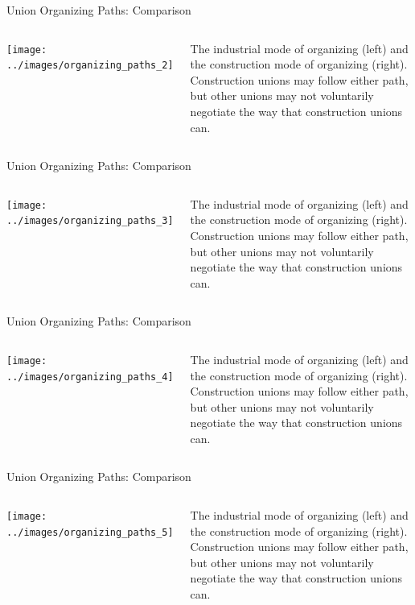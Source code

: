 \documentclass{beamer}
\begin{document}
\begin{frame}{Union Organizing Paths: Comparison}
  \begin{columns}
    \texttt{[image: ../images/organizing\_paths\_2]}

    The industrial mode of organizing (left) and the construction mode of organizing (right).\newline\newline
    Construction unions may follow either path, but other unions may not voluntarily negotiate the way that construction unions can.
    \end{columns}
\end{frame}

\begin{frame}{Union Organizing Paths: Comparison}
  \begin{columns}
    \texttt{[image: ../images/organizing\_paths\_3]}

    The industrial mode of organizing (left) and the construction mode of organizing (right).\newline\newline
    Construction unions may follow either path, but other unions may not voluntarily negotiate the way that construction unions can.
    \end{columns}
\end{frame}

\begin{frame}{Union Organizing Paths: Comparison}
  \begin{columns}
    \texttt{[image: ../images/organizing\_paths\_4]}

    The industrial mode of organizing (left) and the construction mode of organizing (right).\newline\newline
    Construction unions may follow either path, but other unions may not voluntarily negotiate the way that construction unions can.
    \end{columns}
\end{frame}

\begin{frame}{Union Organizing Paths: Comparison}
  \begin{columns}
    \texttt{[image: ../images/organizing\_paths\_5]}

    The industrial mode of organizing (left) and the construction mode of organizing (right).\newline\newline
    Construction unions may follow either path, but other unions may not voluntarily negotiate the way that construction unions can.
    \end{columns}
\end{frame}
\end{document}
